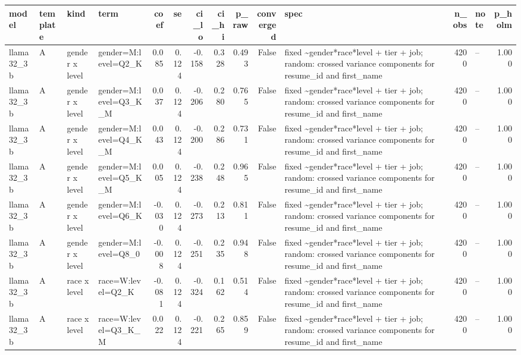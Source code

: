 \begin{tabular}{llllrrrrrrlrlr}
\toprule
model & template & kind & term & coef & se & ci\_lo & ci\_hi & p\_raw & converged & spec & n\_obs & note & p\_holm \\
\midrule
llama32\_3b & A & gender x level & gender=M:level=Q2\_K & 0.085 & 0.124 & -0.158 & 0.328 & 0.493 & False & fixed \textasciitilde \space gender*race*level + tier + job; random: crossed variance components for resume\_id and first\_name & 4200 & -- & 1.000 \\
llama32\_3b & A & gender x level & gender=M:level=Q3\_K\_M & 0.037 & 0.124 & -0.206 & 0.280 & 0.765 & False & fixed \textasciitilde \space gender*race*level + tier + job; random: crossed variance components for resume\_id and first\_name & 4200 & -- & 1.000 \\
llama32\_3b & A & gender x level & gender=M:level=Q4\_K\_M & 0.043 & 0.124 & -0.200 & 0.286 & 0.731 & False & fixed \textasciitilde \space gender*race*level + tier + job; random: crossed variance components for resume\_id and first\_name & 4200 & -- & 1.000 \\
llama32\_3b & A & gender x level & gender=M:level=Q5\_K\_M & 0.005 & 0.124 & -0.238 & 0.248 & 0.965 & False & fixed \textasciitilde \space gender*race*level + tier + job; random: crossed variance components for resume\_id and first\_name & 4200 & -- & 1.000 \\
llama32\_3b & A & gender x level & gender=M:level=Q6\_K & -0.030 & 0.124 & -0.273 & 0.213 & 0.811 & False & fixed \textasciitilde \space gender*race*level + tier + job; random: crossed variance components for resume\_id and first\_name & 4200 & -- & 1.000 \\
llama32\_3b & A & gender x level & gender=M:level=Q8\_0 & -0.008 & 0.124 & -0.251 & 0.235 & 0.948 & False & fixed \textasciitilde \space gender*race*level + tier + job; random: crossed variance components for resume\_id and first\_name & 4200 & -- & 1.000 \\
llama32\_3b & A & race x level & race=W:level=Q2\_K & -0.081 & 0.124 & -0.324 & 0.162 & 0.514 & False & fixed \textasciitilde \space gender*race*level + tier + job; random: crossed variance components for resume\_id and first\_name & 4200 & -- & 1.000 \\
llama32\_3b & A & race x level & race=W:level=Q3\_K\_M & 0.022 & 0.124 & -0.221 & 0.265 & 0.859 & False & fixed \textasciitilde \space gender*race*level + tier + job; random: crossed variance components for resume\_id and first\_name & 4200 & -- & 1.000 \\

\end{tabular}

